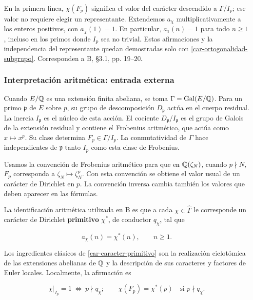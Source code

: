 En la primera línea, $\chi(F_p)$ significa el valor del carácter descendido a $\Gamma/I_p$; ese valor no requiere elegir un representante. Extendemos $a_\chi$ multiplicativamente a los enteros positivos, con $a_\chi(1)=1$. En particular, $a_1(n)=1$ para todo $n\ge1$, incluso en los primos donde $I_p$ sea no trivial. Estas afirmaciones y la independencia del representante quedan demostradas solo con \eqref{car-ortogonalidad-subgrupo}. Corresponden a B, §3.1, pp. 19–20.

\subsubsection*{Interpretación aritmética: entrada externa}

Cuando $E/\mathbb{Q}$ es una extensión finita abeliana, se toma $\Gamma=\operatorname{Gal}(E/\mathbb{Q})$. Para un primo $\mathfrak p$ de $E$ sobre $p$, su grupo de descomposición $D_{\mathfrak p}$ actúa en el cuerpo residual. La inercia $I_{\mathfrak p}$ es el núcleo de esta acción. El cociente $D_{\mathfrak p}/I_{\mathfrak p}$ es el grupo de Galois de la extensión residual y contiene el Frobenius aritmético, que actúa como $x\mapsto x^p$. Su clase determina $F_p\in\Gamma/I_p$. La conmutatividad de $\Gamma$ hace independientes de $\mathfrak p$ tanto $I_p$ como esta clase de Frobenius.

Usamos la convención de Frobenius aritmético para que en $\mathbb{Q}(\zeta_N)$, cuando $p\nmid N$, $F_p$ corresponda a $\zeta_N\mapsto\zeta_N^p$. Con esta convención se obtiene el valor usual de un carácter de Dirichlet en $p$. La convención inversa cambia también los valores que deben aparecer en las fórmulas.

La identificación aritmética utilizada en B es que a cada $\chi\in\widehat\Gamma$ le corresponde un carácter de Dirichlet \textbf{primitivo} $\chi^*$, de conductor $q_\chi$, tal que

\begin{equation}
a_\chi(n)=\chi^*(n),\qquad n\ge1.
\label{car-caracter-primitivo}
\end{equation}

Los ingredientes clásicos de \eqref{car-caracter-primitivo} son la realización ciclotómica de las extensiones abelianas de $\mathbb{Q}$ y la descripción de sus caracteres y factores de Euler locales. Localmente, la afirmación es

\begin{equation}
\chi|_{I_p}=1\ \Longleftrightarrow\ p\nmid q_\chi;
\qquad
\chi(F_p)=\chi^*(p)\quad\text{si }p\nmid q_\chi.
\label{car-conductor}
\end{equation}

